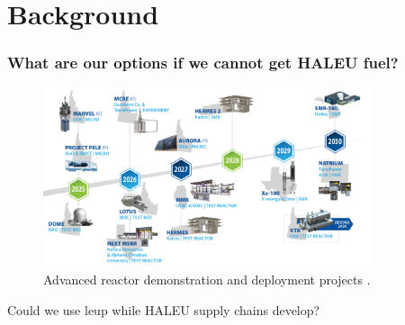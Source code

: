 \documentclass[9pt]{beamer}
\begin{document}

\section{Background}

  \begin{frame}
    \frametitle{What are our options if we cannot get HALEU fuel?}
    \begin{figure}
        \centering
        \includegraphics[width=0.86\textwidth]{../images/reactor_timeline.png}
        \caption{Advanced reactor demonstration and deployment projects \cite{inl_reactor_timeline}.}
    \end{figure}
    Could we use \gls{leup} while HALEU supply chains develop?
  \end{frame}
\end{document}
